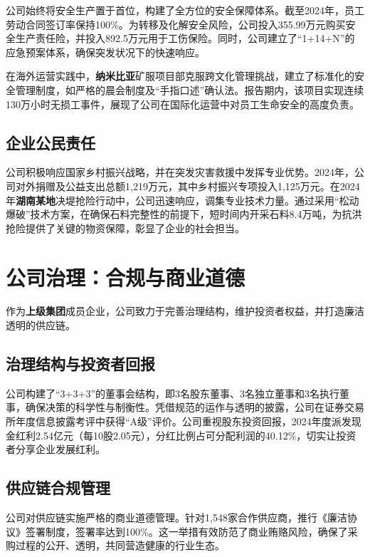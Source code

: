 \documentclass[a4paper,12pt]{article}
\begin{document}
公司始终将安全生产置于首位，构建了全方位的安全保障体系。截至2024年，员工劳动合同签订率保持100\%。为转移及化解安全风险，公司投入355.99万元购买安全生产责任险，并投入892.5万元用于工伤保险。同时，公司建立了“1+14+N”的应急预案体系，确保突发状况下的快速响应。

在海外运营实践中，\textbf{纳米比亚}矿服项目部克服跨文化管理挑战，建立了标准化的安全管理制度，如严格的晨会制度及“手指口述”确认法。报告期内，该项目实现连续130万小时无损工事件，展现了公司在国际化运营中对员工生命安全的高度负责。

\subsection{企业公民责任}

公司积极响应国家乡村振兴战略，并在突发灾害救援中发挥专业优势。2024年，公司对外捐赠及公益支出总额1,219万元，其中乡村振兴专项投入1,125万元。在2024年\textbf{湖南某地}决堤抢险行动中，公司迅速响应，调集专业技术力量。通过采用“松动爆破”技术方案，在确保石料完整性的前提下，短时间内开采石料8.4万吨，为抗洪抢险提供了关键的物资保障，彰显了企业的社会担当。

\section{公司治理：合规与商业道德}

作为\textbf{上级集团}成员企业，公司致力于完善治理结构，维护投资者权益，并打造廉洁透明的供应链。

\subsection{治理结构与投资者回报}

公司构建了“3+3+3”的董事会结构，即3名股东董事、3名独立董事和3名执行董事，确保决策的科学性与制衡性。凭借规范的运作与透明的披露，公司在证券交易所年度信息披露考评中获得“A级”评价。公司重视股东投资回报，2024年度派发现金红利2.54亿元（每10股2.05元），分红比例占可分配利润的40.12\%，切实让投资者分享企业发展红利。

\subsection{供应链合规管理}

公司对供应链实施严格的商业道德管理。针对1,548家合作供应商，推行《廉洁协议》签署制度，签署率达到100\%。这一举措有效防范了商业贿赂风险，确保了采购过程的公开、透明，共同营造健康的行业生态。
\end{document}
